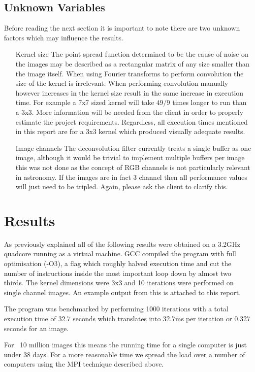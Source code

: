 \documentclass{article}
\begin{document}
\subsection{Unknown Variables}
Before reading the next section it is important to note there are two unknown
factors which may influence the results.
\begin{itemize}
\item[Kernel size] The point spread function determined to be the cause of noise
on the images may be described as a rectangular matrix of any size smaller than
the image itself. When using Fourier transforms to perform convolution the size
of the kernel is irrelevant. When performing convolution manually however
increases in the kernel size result in the same increase in execution time. For
example a 7x7 sized kernel will take $49/9$ times longer to run than a 3x3. More
information will be needed from the client in order to properly estimate the
project requirements. Regardless, all execution times mentioned in this report
are for a 3x3 kernel which produced visually adequate results.
\item[Image channels] The deconvolution filter currently treats a single buffer
as one image, although it would be trivial to implement multiple buffers per
image this was not done as the concept of RGB channels is not particularly
relevant in astronomy. If the images are in fact 3 channel then all performance
values will just need to be tripled. Again, please ask the client to clarify this.
\end{itemize}

\section{Results}
As previously explained all of the following results were obtained on a 3.2GHz
quadcore running as a virtual machine. GCC compiled the program with full
optimisation (-O3), a flag which roughly halved execution time and cut the
number of instructions inside the most important loop down by almost two thirds.
The kernel dimensions were 3x3 and 10
iterations were performed on single channel images. An example output from this
is attached to this report.

The program was benchmarked by performing 1000 iterations with a total execution
time of 32.7 seconds which translates into 32.7ms per iteration or 0.327 seconds
for an image.

For ~10 million images this means the running time for a single computer is just
under 38 days. For a more reasonable time we spread the load over a number of
computers using the MPI technique described above.
\end{document}
